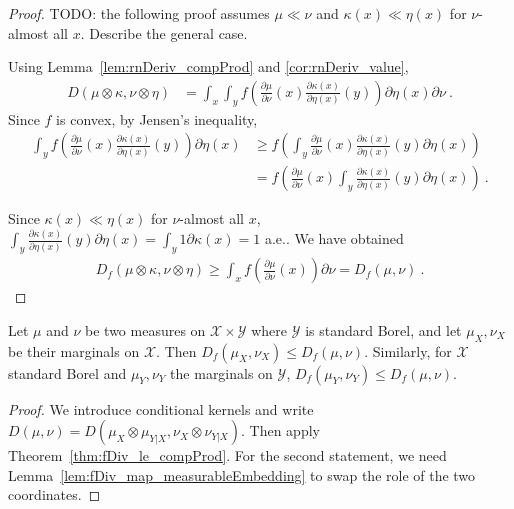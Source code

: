 \begin{proof}\leanok
{}
TODO: the following proof assumes $\mu \ll \nu$ and $\kappa(x) \ll \eta(x)$ for $\nu$-almost all $x$. Describe the general case.

Using Lemma~\ref{lem:rnDeriv_compProd} and \ref{cor:rnDeriv_value},
\begin{align*}
D(\mu \otimes \kappa, \nu \otimes \eta)
&= \int_x \int_y f \left( \frac{\partial \mu}{\partial\nu}(x) \frac{\partial \kappa(x)}{\partial\eta(x)}(y) \right) \partial \eta(x) \partial \nu
\: .
\end{align*}
Since $f$ is convex, by Jensen's inequality,
\begin{align*}
\int_y f \left( \frac{\partial \mu}{\partial\nu}(x) \frac{\partial \kappa(x)}{\partial\eta(x)}(y) \right) \partial \eta(x)
&\ge f \left( \int_y \frac{\partial \mu}{\partial\nu}(x) \frac{\partial \kappa(x)}{\partial\eta(x)}(y) \partial \eta(x) \right)
\\
&= f \left( \frac{\partial \mu}{\partial\nu}(x) \int_y \frac{\partial \kappa(x)}{\partial\eta(x)}(y) \partial \eta(x) \right)
\: .
\end{align*}

Since $\kappa(x) \ll \eta(x)$ for $\nu$-almost all $x$, $\int_y \frac{\partial \kappa(x)}{\partial\eta(x)}(y) \partial \eta(x) = \int_y 1 \partial \kappa(x) = 1$ a.e.. We have obtained
\begin{align*}
D_f(\mu \otimes \kappa, \nu \otimes \eta)
\ge \int_x f \left( \frac{\partial \mu}{\partial\nu}(x)\right) \partial \nu
= D_f(\mu, \nu)
\: .
\end{align*}
\end{proof}

\begin{theorem}[Marginals]
  \label{thm:fDiv_fst_le}
  \leanok
  Let $\mu$ and $\nu$ be two measures on $\mathcal X \times \mathcal Y$ where $\mathcal Y$ is standard Borel, and let $\mu_X, \nu_X$ be their marginals on $\mathcal X$.
  Then $D_f(\mu_X, \nu_X) \le D_f(\mu, \nu)$.
  Similarly, for $\mathcal X$ standard Borel and $\mu_Y, \nu_Y$ the marginals on $\mathcal Y$, $D_f(\mu_Y, \nu_Y) \le D_f(\mu, \nu)$.
\end{theorem}

\begin{proof}\leanok
{}
We introduce conditional kernels and write $D(\mu, \nu) = D(\mu_X \otimes \mu_{Y|X}, \nu_X \otimes \nu_{Y|X})$. Then apply Theorem~\ref{thm:fDiv_le_compProd}.
For the second statement, we need Lemma~\ref{lem:fDiv_map_measurableEmbedding} to swap the role of the two coordinates.
\end{proof}

